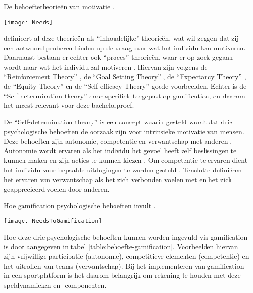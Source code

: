 \begin{table}[h]
    \caption[De behoeftetheorieën van motivatie]{De behoeftetheorieën van motivatie \autocite{Benke2019}.}
    \texttt{[image: Needs]}
    \label{table:behoefte-theorieën}
\end{table}


\textcite{KispalVitai2016} definieert al deze theorieën als “inhoudelijke” theorieën, wat wil zeggen dat zij een antwoord proberen bieden op de vraag over wat het individu kan motiveren. Daarnaast bestaan er echter ook “proces” theorieën, waar er op zoek gegaan wordt naar wat het individu zal motiveren \autocite{Robbins2011}. Hiervan zijn volgens \textcite{Benke2019} de “Reinforcement Theory” \autocite{Skinner1961}, de “Goal Setting Theory” \autocite{Locke1968}, de “Expectancy Theory” \autocite{Vroom1964}, de “Equity Theory” \autocite{Adams1963} en de “Self-efficacy Theory” \autocite{Bandura1973} goede voorbeelden. Echter is de “Self-determination theory” \autocite{Deci1985} door \textcite{Kam2018} specifiek toegepast op gamification, en daarom het meest relevant voor deze bachelorproef.

De “Self-determination theory” is een concept waarin gesteld wordt dat drie psychologische behoeften de oorzaak zijn voor intrinsieke motivatie van mensen. Deze behoeften zijn autonomie, competentie en verwantschap met anderen \autocite{Ryan2000}.
Autonomie wordt ervaren als het individu het gevoel heeft zelf beslissingen te kunnen maken en zijn acties te kunnen kiezen \autocite{Ryan2000}.
Om competentie te ervaren dient het individu voor bepaalde uitdagingen te worden gesteld \autocite{Kam2018}. Tenslotte definiëren \textcite{Kam2018} het ervaren van verwantschap als het zich verbonden voelen met en het zich geapprecieerd voelen door anderen.

\begin{table}[h]
    \caption[Hoe gamification psychologische behoeften invult]{Hoe gamification psychologische behoeften invult \autocite{Kam2018}.}
    \texttt{[image: NeedsToGamification]}
    \label{table:behoefte-gamification}
\end{table}

Hoe deze drie psychologische behoeften kunnen worden ingevuld via gamification is door \textcite{Kam2018} aangegeven in tabel \ref{table:behoefte-gamification}. Voorbeelden hiervan zijn vrijwillige participatie (autonomie), competitieve elementen (competentie) en het uitrollen van teams (verwantschap). Bij het implementeren van gamification in een sportplatform is het daarom belangrijk om rekening te houden met deze speldynamieken en -componenten.

